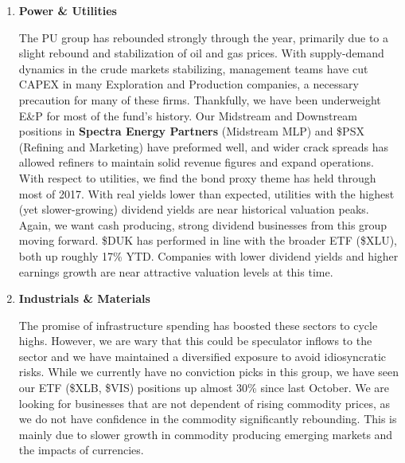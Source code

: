 \documentclass[11pt,pressrelease]{newlfm} %
\begin{document}
\begin{newlfm}
\begin{singlespace}
\begin{enumerate}
\item \textbf{Power \& Utilities} \par
The PU group has rebounded strongly through the year, primarily due to a slight rebound and stabilization of oil and gas prices. With supply-demand dynamics in the crude markets stabilizing, management teams have cut CAPEX in many Exploration and Production companies, a necessary precaution for many of these firms. Thankfully, we have been underweight E\&P for most of the fund's history. Our Midstream and Downstream positions in \textbf{Spectra Energy Partners} (Midstream MLP) and \$PSX (Refining and Marketing) have preformed well, and wider crack spreads has allowed refiners to maintain solid revenue figures and expand operations. With respect to utilities, we find the bond proxy theme has held through most of 2017. With real yields lower than expected, utilities with the highest (yet slower-growing) dividend yields are near historical valuation peaks. Again, we want cash producing, strong dividend businesses from this group moving forward. \$DUK has performed in line with the broader ETF (\$XLU), both up roughly 17\% YTD. Companies with lower dividend yields and higher earnings growth are near attractive valuation levels at this time.

\item \textbf{Industrials \& Materials} \par
The promise of infrastructure spending has boosted these sectors to cycle highs. However, we are wary that this could be speculator inflows to the sector and we have maintained a diversified exposure to avoid idiosyncratic risks. While we currently have no conviction picks in this group, we have seen our ETF (\$XLB, \$VIS) positions up almost 30\% since last October. We are looking for businesses that are not dependent of rising commodity prices, as we do not have confidence in the commodity significantly rebounding. This is mainly due to slower growth in commodity producing emerging markets and the impacts of currencies.


\end{enumerate}
\end{singlespace}
\end{newlfm}
\end{document}
